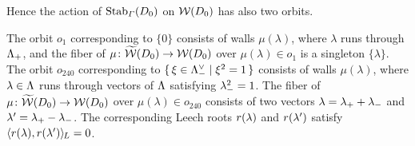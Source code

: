 \documentclass{amsart} %
\begin{document}
Hence the action of $\operatorname{Stab}_{\varGamma}(D_0)$ on $\mathord{\mathcal{W}}(D_0)$ 
has also two orbits.
\par
The orbit $o_1$ corresponding to $\{0\}$
consists of walls $\mu(\lambda)$,
where $\lambda$ runs through $\Lambda_{+}$,
and the fiber of $\mu\colon \widetilde{\mathord{\mathcal{W}}}(D_0)\to\mathord{\mathcal{W}}(D_0)$ 
over $\mu(\lambda)\in o_1$ is a singleton $\{\lambda\}$.
The orbit $o_{240}$ corresponding to $\{\,{\xi\in \Lambda_{-}^{\vee}}\mid {\xi^2=1} \,\}$
consists of walls $\mu(\lambda)$,
where $\lambda\in \Lambda$ runs through
vectors of $\Lambda$ satisfying ${\lambda}_{-}^2=1$.
The fiber of $\mu\colon \widetilde{\mathord{\mathcal{W}}}(D_0)\to\mathord{\mathcal{W}}(D_0)$ 
over $\mu(\lambda)\in o_{240}$ consists 
of two vectors
$\lambda={\lambda}_{+}+{\lambda}_{-}$ and $\lambda^{\prime}={\lambda}_{+}-{\lambda}_{-}$.
The corresponding Leech roots 
$r(\lambda)$ and $r(\lambda^{\prime})$ satisfy
$\langle r(\lambda), r(\lambda^{\prime}) \rangle_{\hskip -1pt L}=0$.
%
%
\end{document}
